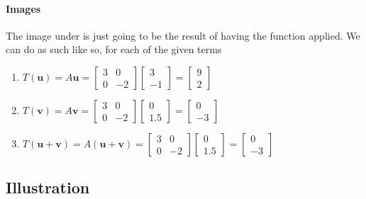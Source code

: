 \documentclass{article}
\begin{document}
        \paragraph{Images}
            The image under is just going to be the result of having the function
            applied. We can do as such like so, for each of the given terms
            \begin{enumerate}
                \item 
                    $T(\mathbf{u}) = A\mathbf{u} = \begin{bmatrix}3 & 0\\0 & -2\end{bmatrix}\begin{bmatrix}3\\-1\end{bmatrix} = \begin{bmatrix}9\\2\end{bmatrix}$
                \item 
                    $T(\mathbf{v}) = A\mathbf{v} = \begin{bmatrix}3 & 0\\0 & -2\end{bmatrix}\begin{bmatrix}0\\1.5\end{bmatrix} = \begin{bmatrix}0\\-3\end{bmatrix}$
                \item 
                    $T(\mathbf{u}+\mathbf{v}) = A(\mathbf{u}+\mathbf{v}) = \begin{bmatrix}3 & 0\\0 & -2\end{bmatrix}\begin{bmatrix}0\\1.5\end{bmatrix} = \begin{bmatrix}0\\-3\end{bmatrix}$
            \end{enumerate}
    \newpage
    \subsection{Illustration}
\end{document}
